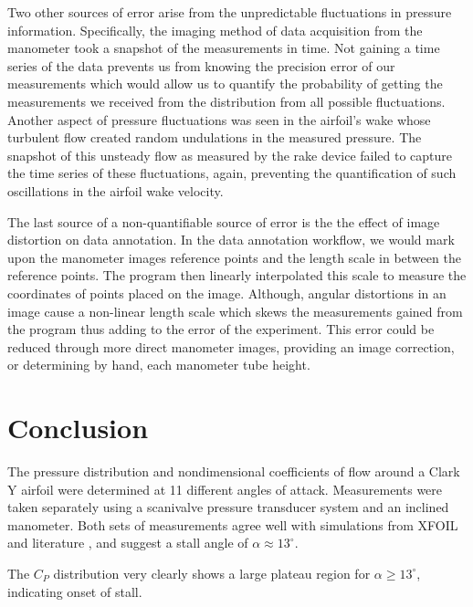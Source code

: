 \documentclass[runningheads]{llncs}
\begin{document}
\noindent
Two other sources of error arise from the unpredictable fluctuations in pressure information. Specifically, the imaging method of data acquisition from the manometer took a snapshot of the measurements in time. Not gaining a time series of the data prevents us from knowing the precision error of our measurements which would allow us to quantify the probability of getting the measurements we received from the distribution from all possible fluctuations. Another aspect of pressure fluctuations was seen in the airfoil's wake whose turbulent flow created random undulations in the measured pressure. The snapshot of this unsteady flow as measured by the rake device failed to capture the time series of these fluctuations, again, preventing the quantification of such oscillations in the airfoil wake velocity.\newline

\noindent
The last source of a non-quantifiable source of error is the the effect of image distortion on data annotation. In the data annotation workflow, we would mark upon the manometer images reference points and the length scale in between the reference points. The program then linearly interpolated this scale to measure the coordinates of points placed on the image. Although, angular distortions in an image cause a non-linear length scale which skews the measurements gained from the program thus adding to the error of the experiment. This error could be reduced through more direct manometer images, providing an image correction, or determining by hand, each manometer tube height.




\section{Conclusion}
The pressure distribution and nondimensional coefficients of flow around a Clark Y airfoil were determined at 11 different angles of attack. Measurements were taken separately using a scanivalve pressure transducer system and an inclined manometer. Both sets of measurements agree well with simulations from XFOIL and literature \cite{lyon_broeren_giguere_gopalarathnam_selig_1997}, and suggest a stall angle of $\alpha \approx 13^\circ$.

The $C_P$ distribution very clearly shows a large plateau region for $\alpha \ge 13^\circ$, indicating onset of stall.
\end{document}
